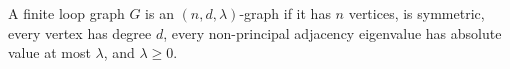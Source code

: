 \begin{definition}
A finite loop graph \(G\) is an \((n,d,\lambda)\)-graph if it has \(n\) vertices, is symmetric, every vertex has degree \(d\), every non-principal adjacency eigenvalue has absolute value at most \(\lambda\), and \(\lambda\ge 0\).
\end{definition}
